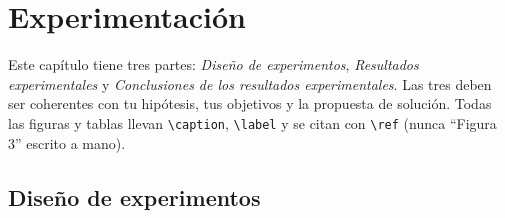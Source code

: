 
\section{Experimentación} \label{sec:experimentacion}

\begin{guia}
Este capítulo tiene tres partes: \emph{Diseño de experimentos}, \emph{Resultados experimentales} y
\emph{Conclusiones de los resultados experimentales}. Las tres deben ser coherentes con tu hipótesis, tus objetivos y
la propuesta de solución. Todas las figuras y tablas llevan \verb|\caption|, \verb|\label| y se citan con
\verb|\ref| (nunca ``Figura 3'' escrito a mano).
\end{guia}

\subsection{Diseño de experimentos} \label{sec:diseno_experimentos} %

